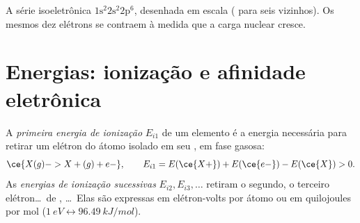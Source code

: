 \begin{omfigure}

{\small A série isoeletrônica $1\text{s}^2 2\text{s}^2 2\text{p}^6$,
desenhada em escala ( para seis vizinhos). Os mesmos dez
elétrons se contraem à medida que a carga nuclear cresce.}
\end{omfigure}

\section{Energias: ionização e afinidade eletrônica}

\begin{definition}\label{def:b1:periodicity:ionisation-energy}
A \emph{primeira energia de ionização} $E_{i1}$
de um elemento é a energia necessária para retirar um elétron do átomo
isolado em seu , em fase gasosa:
\[
  \ce{X(g) -> X+(g) + e-}, \qquad E_{i1} = E(\ce{X+}) + E(\ce{e-}) - E(\ce{X}) > 0 .
\]
As \emph{energias de ionização sucessivas}
$E_{i2}, E_{i3}, \dots$ retiram o segundo, o terceiro
elétron\dots\ de , \dots\ Elas são expressas em
elétron-volts por átomo ou em quilojoules por mol
($\qty{1}{eV} \leftrightarrow \qty{96.49}{kJ/mol}$).
\end{definition}

